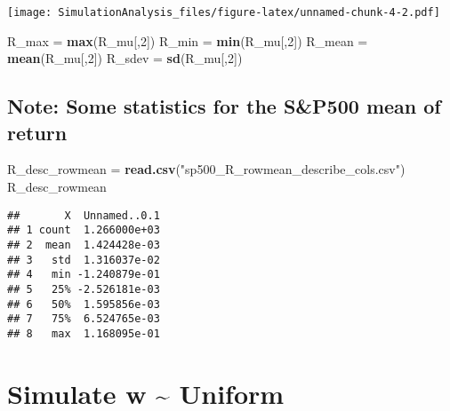\documentclass[
]{article}
\newenvironment{Shaded}{\begin{snugshade}}{\end{snugshade}}
\newcommand{\DecValTok}[1]{\textcolor[rgb]{0.00,0.00,0.81}{#1}}
\newcommand{\KeywordTok}[1]{\textcolor[rgb]{0.13,0.29,0.53}{\textbf{#1}}}
\newcommand{\NormalTok}[1]{#1}
\newcommand{\StringTok}[1]{\textcolor[rgb]{0.31,0.60,0.02}{#1}}
\begin{document}
\texttt{[image: SimulationAnalysis\_files/figure-latex/unnamed-chunk-4-2.pdf]}

\begin{Shaded}
\begin{Highlighting}[]
\NormalTok{R_max =}\StringTok{ }\KeywordTok{max}\NormalTok{(R_mu[,}\DecValTok{2}\NormalTok{])}
\NormalTok{R_min =}\StringTok{ }\KeywordTok{min}\NormalTok{(R_mu[,}\DecValTok{2}\NormalTok{])}
\NormalTok{R_mean =}\StringTok{ }\KeywordTok{mean}\NormalTok{(R_mu[,}\DecValTok{2}\NormalTok{])}
\NormalTok{R_sdev =}\StringTok{ }\KeywordTok{sd}\NormalTok{(R_mu[,}\DecValTok{2}\NormalTok{])}
\end{Highlighting}
\end{Shaded}

\hypertarget{note-some-statistics-for-the-sp500-mean-of-return}{%
\subsection{Note: Some statistics for the S\&P500 mean of
return}\label{note-some-statistics-for-the-sp500-mean-of-return}}

\begin{Shaded}
\begin{Highlighting}[]
\NormalTok{R_desc_rowmean =}\StringTok{ }\KeywordTok{read.csv}\NormalTok{(}\StringTok{"sp500_R_rowmean_describe_cols.csv"}\NormalTok{)}
\NormalTok{R_desc_rowmean}
\end{Highlighting}
\end{Shaded}

\begin{verbatim}
##       X  Unnamed..0.1
## 1 count  1.266000e+03
## 2  mean  1.424428e-03
## 3   std  1.316037e-02
## 4   min -1.240879e-01
## 5   25% -2.526181e-03
## 6   50%  1.595856e-03
## 7   75%  6.524765e-03
## 8   max  1.168095e-01
\end{verbatim}

\hypertarget{simulate-w-uniform}{%
\section{Simulate w \textasciitilde{}
Uniform}\label{simulate-w-uniform}}
\end{document}
